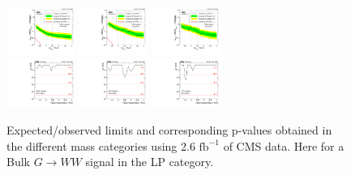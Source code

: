 \begin{figure}[h!]
\centering
\includegraphics[width=0.20\textwidth]{figures/analysis/search1/AN-15-211/limits/brazilianFlag_BulkWW_WWLP_13TeV_wPDF.pdf}
\includegraphics[width=0.20\textwidth]{figures/analysis/search1/AN-15-211/limits/brazilianFlag_BulkWW_WZLP_13TeV_wPDF.pdf}
\includegraphics[width=0.20\textwidth]{figures/analysis/search1/AN-15-211/limits/brazilianFlag_BulkWW_ZZLP_13TeV_wPDF.pdf}\\
\includegraphics[width=0.20\textwidth]{figures/analysis/search1/AN-15-211/pvalues/pvalue_BulkWWinWW_low_purity.pdf}
\includegraphics[width=0.20\textwidth]{figures/analysis/search1/AN-15-211/pvalues/pvalue_BulkWWinWZ_low_purity.pdf}
\includegraphics[width=0.20\textwidth]{figures/analysis/search1/AN-15-211/pvalues/pvalue_BulkWWinZZ_low_purity.pdf}
\caption{Expected/observed limits and corresponding p-values obtained in the different mass categories using 2.6 $\textrm{fb}^{-1}$ of CMS data. Here for a Bulk $G\rightarrow WW$ signal in the LP category.}
\label{fig:app:Limits_LPBulkWW}
\end{figure}



